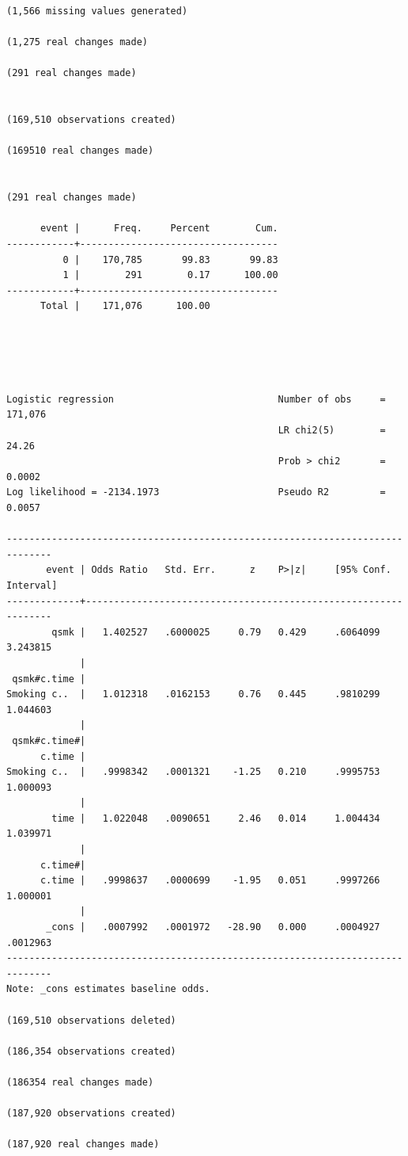 \documentclass[
  10pt,
]{book}
\begin{document}
\begin{verbatim}
(1,566 missing values generated)

(1,275 real changes made)

(291 real changes made)


(169,510 observations created)

(169510 real changes made)


(291 real changes made)

      event |      Freq.     Percent        Cum.
------------+-----------------------------------
          0 |    170,785       99.83       99.83
          1 |        291        0.17      100.00
------------+-----------------------------------
      Total |    171,076      100.00





Logistic regression                             Number of obs     =    171,076
                                                LR chi2(5)        =      24.26
                                                Prob > chi2       =     0.0002
Log likelihood = -2134.1973                     Pseudo R2         =     0.0057

------------------------------------------------------------------------------
       event | Odds Ratio   Std. Err.      z    P>|z|     [95% Conf. Interval]
-------------+----------------------------------------------------------------
        qsmk |   1.402527   .6000025     0.79   0.429     .6064099    3.243815
             |
 qsmk#c.time |
Smoking c..  |   1.012318   .0162153     0.76   0.445     .9810299    1.044603
             |
 qsmk#c.time#|
      c.time |
Smoking c..  |   .9998342   .0001321    -1.25   0.210     .9995753    1.000093
             |
        time |   1.022048   .0090651     2.46   0.014     1.004434    1.039971
             |
      c.time#|
      c.time |   .9998637   .0000699    -1.95   0.051     .9997266    1.000001
             |
       _cons |   .0007992   .0001972   -28.90   0.000     .0004927    .0012963
------------------------------------------------------------------------------
Note: _cons estimates baseline odds.

(169,510 observations deleted)

(186,354 observations created)

(186354 real changes made)

(187,920 observations created)

(187,920 real changes made)







\end{verbatim}
\end{document}
